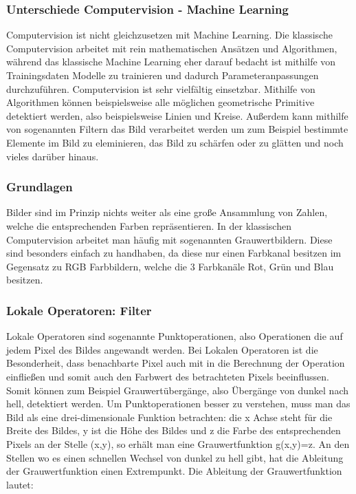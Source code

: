 \documentclass[12pt, a4paper]{article}
\begin{document}
\subsubsection{Unterschiede Computervision - Machine Learning}
Computervision ist nicht gleichzusetzen mit Machine Learning. Die klassische Computervision arbeitet mit rein mathematischen Ansätzen und Algorithmen, während das klassische Machine Learning eher darauf bedacht ist mithilfe von Trainingsdaten Modelle zu trainieren und dadurch Parameteranpassungen durchzuführen. Computervision ist sehr vielfältig einsetzbar. Mithilfe von Algorithmen können beispielsweise alle möglichen geometrische Primitive detektiert werden, also beispielsweise Linien und Kreise. Außerdem kann mithilfe von sogenannten Filtern das Bild verarbeitet werden um zum Beispiel bestimmte Elemente im Bild zu eleminieren, das Bild zu schärfen oder zu glätten und noch vieles darüber hinaus.

\subsubsection{Grundlagen}
Bilder sind im Prinzip nichts weiter als eine große Ansammlung von Zahlen, welche die entsprechenden Farben repräsentieren. In der klassischen Computervision arbeitet man häufig mit sogenannten Grauwertbildern. Diese sind besonders einfach zu handhaben, da diese nur einen Farbkanal besitzen im Gegensatz zu RGB Farbbildern, welche die 3 Farbkanäle Rot, Grün und Blau besitzen.

\subsubsection{Lokale Operatoren: Filter}
Lokale Operatoren sind sogenannte Punktoperationen, also Operationen die auf jedem Pixel des Bildes angewandt werden. Bei Lokalen Operatoren ist die Besonderheit, dass benachbarte Pixel auch mit in die Berechnung der Operation einfließen und somit auch den Farbwert des betrachteten Pixels beeinflussen. Somit können zum Beispiel Grauwertübergänge, also Übergänge von dunkel nach hell, detektiert werden. Um Punktoperationen besser zu verstehen, muss man das Bild als eine drei-dimensionale Funktion betrachten: die x Achse steht für die Breite des Bildes, y ist die Höhe des Bildes und z die Farbe des entsprechenden Pixels an der Stelle (x,y), so erhält man eine Grauwertfunktion g(x,y)=z. An den Stellen wo es einen schnellen Wechsel von dunkel zu hell gibt, hat die Ableitung der Grauwertfunktion einen Extrempunkt. Die Ableitung der Grauwertfunktion ~\cite{b5} lautet:
\newline
\end{document}
